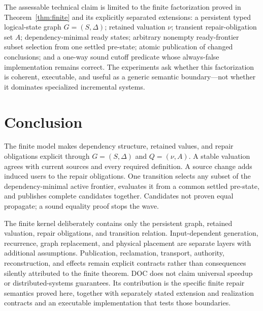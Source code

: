 The assessable technical claim is limited to the finite factorization proved in Theorem~\ref{thm:finite} and its explicitly separated extensions: a persistent typed logical-state graph $G=(S,\Delta)$; retained valuation $\nu$; transient repair-obligation set $A$; dependency-minimal ready states; arbitrary nonempty ready-frontier subset selection from one settled pre-state; atomic publication of changed conclusions; and a one-way sound cutoff predicate whose always-false implementation remains correct. The experiments ask whether this factorization is coherent, executable, and useful as a generic semantic boundary---not whether it dominates specialized incremental systems.

\section{Conclusion}
The finite model makes dependency structure, retained values, and repair obligations explicit through $G=(S,\Delta)$ and $Q=(\nu,A)$. A stable valuation agrees with current sources and every required definition. A source change adds induced users to the repair obligations. One transition selects any subset of the dependency-minimal active frontier, evaluates it from a common settled pre-state, and publishes complete candidates together. Candidates not proven equal propagate; a sound equality proof stops the wave.

The finite kernel deliberately contains only the persistent graph, retained valuation, repair obligations, and transition relation. Input-dependent generation, recurrence, graph replacement, and physical placement are separate layers with additional assumptions. Publication, reclamation, transport, authority, reconstruction, and effects remain explicit contracts rather than consequences silently attributed to the finite theorem. DOC does not claim universal speedup or distributed-systems guarantees. Its contribution is the specific finite repair semantics proved here, together with separately stated extension and realization contracts and an executable implementation that tests those boundaries.
